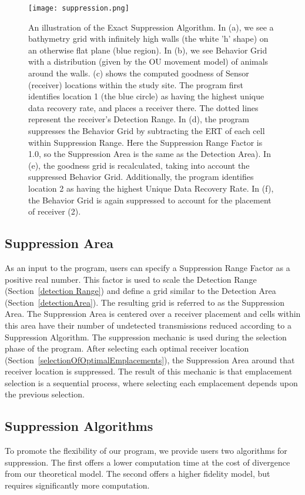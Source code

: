 \begin{figure}[t]
	\label{suppressionImage}
	\centering
	\texttt{[image: suppression.png]}
	\caption{An illustration of the Exact Suppression Algorithm.  In (a), we see a bathymetry grid with infinitely high walls (the white 'h' shape) on an otherwise flat plane (blue region).  In (b), we see Behavior Grid with a distribution (given by the OU movement model) of animals around the walls.  (c) shows the computed goodness of Sensor (receiver) locations within the study site.  The program first identifies location 1 (the blue circle) as having the highest unique data recovery rate, and places a receiver there.  The dotted lines represent the receiver's Detection Range.  In (d), the program suppresses the Behavior Grid by subtracting the ERT of each cell within Suppression Range.  Here the Suppression Range Factor is 1.0, so the Suppression Area is the same as the Detection Area).  In (e), the goodness grid is recalculated, taking into account the suppressed Behavior Grid.  Additionally, the program identifies location 2 as having the highest Unique Data Recovery Rate.  In (f), the Behavior Grid is again suppressed to account for the placement of receiver (2).}
\end{figure}

\subsection{Suppression Area}
As an input to the program, users can specify a Suppression Range Factor as a positive real number.  This factor is used to scale the Detection Range (Section~\ref{detection Range}) and define a grid similar to the Detection Area (Section~\ref{detectionArea}).  The resulting grid is referred to as the Suppression Area.  The Suppression Area is centered over a receiver placement and cells within this area have their number of undetected transmissions reduced according to a Suppression Algorithm.  The suppression mechanic is used during the selection phase of the program.  After selecting each optimal receiver location (Section~\ref{selectionOfOptimalEmplacements}), the Suppression Area around that receiver location is suppressed.  The result of this mechanic is that emplacement selection is a sequential process, where selecting each emplacement depends upon the previous selection.  

\subsection{Suppression Algorithms}
\label{suppressionAlgorithms}
To promote the flexibility of our program, we provide users two algorithms for suppression.  The first offers a lower computation time at the cost of divergence from our theoretical model.  The second offers a higher fidelity model, but requires significantly more computation.


